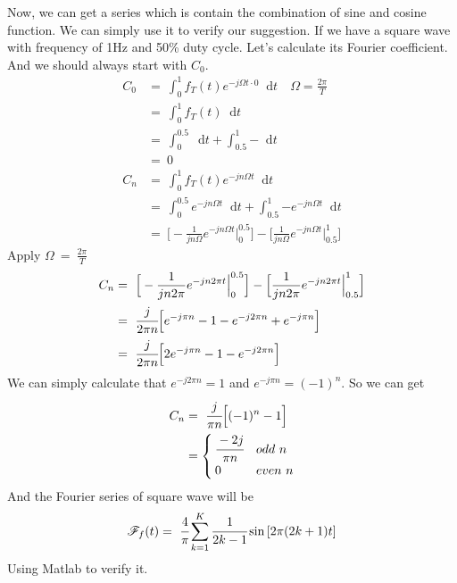 \documentclass[margin,line]{res}
\newcommand*{\dif}{\mathop{}\!\mathrm{d}}
\begin{document}
\begin{resume}
Now, we can get a series which is contain the combination of sine and cosine function. We can simply use it to verify our suggestion. If we have a square wave with frequency of 1Hz and 50\% duty cycle. Let's calculate its Fourier coefficient. And we should always start with $C_0$.
\begin{align}
C_0 &= \ \int_{0}^{1}{f_T(t) e^{-j\Omega t \cdot 0} \dif t} \quad \Omega=\frac{2\pi}{T} \nonumber \\
	&=\ \int_{0}^{1}{f_T(t) \dif t} \nonumber \\
	&=\ \int_{0}^{0.5}{\dif t} + \int_{0.5}^{1}{- \dif t} \nonumber \\
	&=\ 0 \nonumber \\
C_n &= \ \int_{0}^{1}{ f_T(t) e^{-jn\Omega t} \dif t} \nonumber \\
	&= \ \int_{0}^{0.5}{e^{-jn\Omega t} \dif t} +
		 \int_{0.5}^{1}{-e^{-jn\Omega t} \dif t} \nonumber \\
	&= \ \Big[-\frac{1}{jn\Omega} e^{-jn\Omega t}\Big|_{0}^{0.5} \Big] -
	   	 \Big[\frac{1}{jn\Omega} e^{-jn\Omega t}\Big|_{0.5}^{1} \Big] \nonumber
\end{align}
Apply $\Omega \ = \ \frac{2\pi}{T} $
\begin{align}
C_n	&= \ \Big[-\frac{1}{jn2\pi} e^{-jn2\pi t}\Big|_{0}^{0.5} \Big] -
		 \Big[\frac{1}{jn2\pi} e^{-jn2\pi t}\Big|_{0.5}^{1} \Big] \nonumber \\
	&= \ \cfrac{j}{2\pi n}\Big[ e^{-j\pi n} -1 -e^{-j2\pi n} +e^{-j\pi n} \Big] \nonumber \\
	&= \ \cfrac{j}{2\pi n}\Big[ 2e^{-j\pi n} -1 -e^{-j2\pi n} \Big] \nonumber
\end{align}
We can simply calculate that $e^{-j2\pi n}=1$ and $e^{-j\pi n}=(-1)^{n}$. So we can get
\begin{align}
C_n &= \ \cfrac{j}{\pi n}\Big[ (-1)^n-1 \Big] \nonumber \\
	&=\begin{cases}
		\cfrac{-2j}{\pi n}&  {odd \ n} \\
		0&  {even \ n}
 	  \end{cases}	\nonumber
\end{align}
And the Fourier series of square wave will be
$$
\mathscr{F}_f(t)= \ \cfrac{4}{\pi} \sum\limits_{k=1}^K{\cfrac{1}{2k-1} \sin \left[2\pi (2k+1)t\right]}
$$
Using Matlab to verify it.
\begin{figure}[H]
	\centerline{}
\end{figure}
\clearpage


\end{resume}
\end{document}
